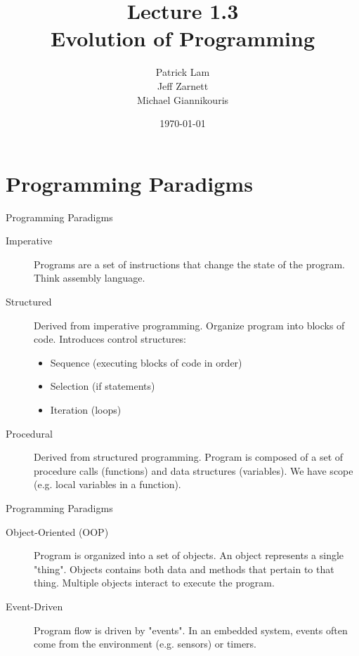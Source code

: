 \documentclass{beamer}
\title{Lecture 1.3 \\ Evolution of Programming}
\date{\today}
\author{Patrick Lam \\ Jeff Zarnett \\ Michael Giannikouris}
\institute{Department of Electrical and Computer Engineering}
\begin{document}
\maketitle

\section{Programming Paradigms}
  
\begin{frame}{Programming Paradigms}
	\begin{description}
		\item[Imperative]		
		Programs are a set of instructions that change the state of the program. Think assembly language.
		
		\item[Structured]
		Derived from imperative programming. Organize program into blocks of code. Introduces control structures:
		
		\begin{itemize}
			\item Sequence	(executing blocks of code in order)
			\item Selection (if statements)
			\item Iteration (loops)
		\end{itemize}
		
		\item[Procedural]
		Derived from structured programming. Program is composed of a set of procedure calls (functions) and data structures (variables). We have scope (e.g. local variables in a function).

	\end{description}
\end{frame}  
  
\begin{frame}{Programming Paradigms}

	\begin{description}
		\item[Object-Oriented (OOP)]
		Program is organized into a set of objects. An object represents a single "thing". Objects contains both data and methods that pertain to that thing. Multiple objects interact to execute the program.
		
		\item[Event-Driven]
		Program flow is driven by "events". In an embedded system, events often come from the environment (e.g. sensors) or timers.
	\end{description}
\end{frame}  
\end{document}
